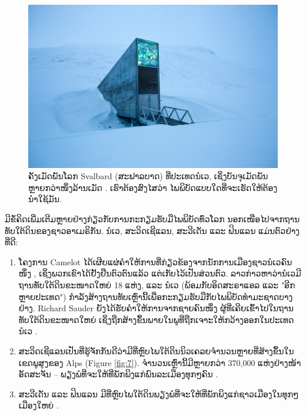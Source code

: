 \documentclass[10pt,twocolumn,letterpaper]{article}
\begin{document}
\begin{figure}[t]
\begin{center}
   \includegraphics[width=1\linewidth]{svalbard.jpg}
\end{center}
   \caption{ຄັງເມັດພັນໂລກ Svalbard (ສະຟາລບາດ) ທີ່ປະເທດນໍເວ, ເຊິ່ງບັນຈຸເມັດພັນຫຼາຍກວ່າໜຶ່ງລ້ານເມັດ \cite{24}.
ເຮົາຕ້ອງສົງໄສວ່າ ໄພພິບັດແບບໃດທີ່ຈະເຮັດໃຫ້ຕ້ອງນຳໃຊ້ມັນ.}
\label{fig:8}
\label{fig:onecol}
\end{figure}

ມີຂໍ້ຄິດເພີ່ມເຕີມຫຼາຍຢ່າງກ່ຽວກັບການກະກຽມຮັບມືໄພພິບັດທົ່ວໂລກ ນອກເໜືອໄປຈາກຖານທັບໃຕ້ດິນຂອງຊາວອາເມຣິກັນ.
ນໍເວ, ສະວິດເຊີແລນ, ສະວີເດັນ ແລະ ຟິນແລນ ແມ່ນຕົວຢ່າງທີ່ດີ:

\begin{flushleft}
\begin{enumerate}
    \item ໂຄງການ Camelot ໄດ້ເຜີຍແຜ່ຄຳໃຫ້ການທີ່ກ່ຽວຂ້ອງຈາກນັກການເມືອງຊາວນໍເວຄົນໜຶ່ງ \cite{25,26}, ເຊິ່ງພວກເຂົາໄດ້ຢັ້ງຢືນຕົວຕົນແລ້ວ ແຕ່ເກັບໄວ້ເປັນສ່ວນຕົວ. 
ລາວກ່າວຫາວ່ານໍເວມີຖານທັບໃຕ້ດິນຂະໜາດໃຫຍ່ 18 ແຫ່ງ, ແລະ ນໍເວ (ພ້ອມກັບອິດສະຣາແອລ ແລະ "ອີກຫຼາຍປະເທດ") ກໍາລັງສ້າງຖານທັບເຫຼົ່ານີ້ເພື່ອກະກຽມຮັບມືກັບໄພພິບັດທໍາມະຊາດບາງຢ່າງ. 
Richard Sauder ຍັງໄດ້ຮັບຄຳໃຫ້ການຈາກຊາຍຄົນໜຶ່ງ ຜູ້ທີ່ເຄີຍເຂົ້າໄປໃນຖານທັບໃຕ້ດິນຂະໜາດໃຫຍ່ ເຊິ່ງຖືກສ້າງຂຶ້ນພາຍໃນພູທີ່ຖືກເຈາະໃຫ້ກວ້າງອອກໃນປະເທດນໍເວ \cite{22}. \
    \item ສະວິດເຊີແລນເປັນທີ່ຮູ້ຈັກກັນດີວ່າມີທີ່ຫຼົບໄພໃຕ້ດິນນິວເຄລຍຈໍານວນຫຼາຍທີ່ສ້າງຂຶ້ນໃນເຂດພູສູງຂອງ Alps (Figure \ref{fig:7}).
ຈຳນວນເຫຼົ່ານີ້ມີຫຼາຍກວ່າ 370,000 ແຫ່ງຢ່າງໜ້າອັດສະຈັນ – ພຽງພໍທີ່ຈະໃຫ້ທີ່ພັກພິງແກ່ພົນລະເມືອງທຸກໆຄົນ \cite{27}. 
    \item ສະວີເດັນ ແລະ ຟິນແລນ ມີທີ່ຫຼົບໄພໃຕ້ດິນພຽງພໍທີ່ຈະໃຫ້ທີ່ພັກພິງແກ່ຊາວເມືອງໃນທຸກໆເມືອງໃຫຍ່ \cite{27}. 
\end{enumerate}
\end{flushleft}
\end{document}

